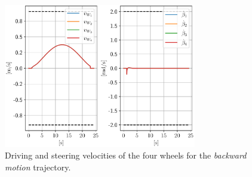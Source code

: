 \begin{figure}
    \centering
    \includegraphics[width=0.75\textwidth]{figures/SWMR/simulations/backward/wheels_velocities.pdf}
    \caption{Driving and steering velocities of the four wheels for the \textit{backward motion} trajectory.}
    \label{fig:simulations:backward:wheel-velocities}
\end{figure}

